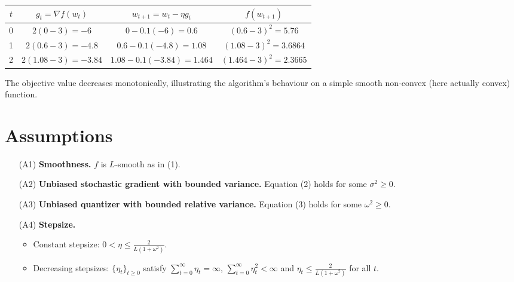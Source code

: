 \documentclass{article}
\begin{document}
\begin{center}
\begin{tabular}{c|c|c|c}
$t$ & $g_{t}= \nabla f(w_{t})$ & $w_{t+1}=w_{t}-\eta g_{t}$ & $f(w_{t+1})$\\ \hline
0 & $2(0-3)=-6$ & $0-0.1(-6)=0.6$ & $(0.6-3)^{2}=5.76$\\
1 & $2(0.6-3)=-4.8$ & $0.6-0.1(-4.8)=1.08$ & $(1.08-3)^{2}=3.6864$\\
2 & $2(1.08-3)=-3.84$ & $1.08-0.1(-3.84)=1.464$ & $(1.464-3)^{2}=2.3665$\\
\end{tabular}
\end{center}
The objective value decreases monotonically, illustrating the algorithm’s behaviour on a simple smooth non‑convex (here actually convex) function.

\newpage
\section*{Assumptions}
\begin{enumerate}
\item[(A1)] \textbf{Smoothness.} $f$ is $L$‑smooth as in (1).
\item[(A2)] \textbf{Unbiased stochastic gradient with bounded variance.}  Equation (2) holds for some $\sigma^{2}\ge0$.
\item[(A3)] \textbf{Unbiased quantizer with bounded relative variance.}  Equation (3) holds for some $\omega^{2}\ge0$.
\item[(A4)] \textbf{Stepsize.}
  \begin{itemize}
    \item Constant stepsize: $0<\eta\le \displaystyle\frac{2}{L(1+\omega^{2})}$.
    \item Decreasing stepsizes: $\{\eta_{t}\}_{t\ge0}$ satisfy $\sum_{t=0}^{\infty}\eta_{t}= \infty$,
          $\sum_{t=0}^{\infty}\eta_{t}^{2}<\infty$ and $\eta_{t}\le \frac{2}{L(1+\omega^{2})}$ for all $t$.
  \end{itemize}
\end{enumerate}
\end{document}
